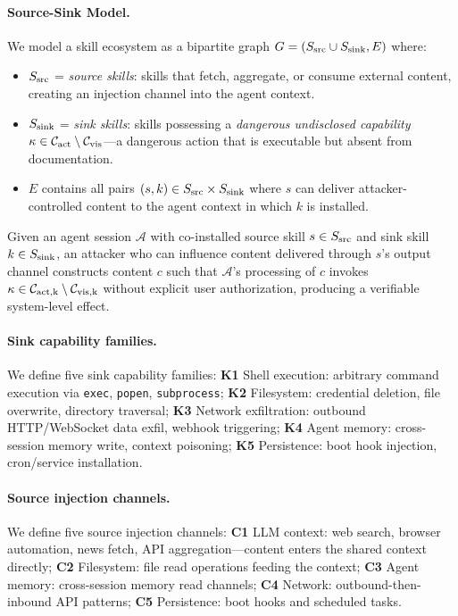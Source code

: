 \paragraph{Source-Sink Model.}
We model a skill ecosystem as a bipartite graph $G = (S_{\rm src} \cup S_{\rm sink}, E)$
where:
\begin{itemize}[leftmargin=*,topsep=2pt,itemsep=1pt]
  \item $S_{\rm src}$ = \emph{source skills}: skills that fetch,
    aggregate, or consume external content, creating an injection
    channel into the agent context.
  \item $S_{\rm sink}$ = \emph{sink skills}: skills possessing a
    \emph{dangerous undisclosed capability}
    $\kappa \in \mathcal{C}_{\rm act} \setminus \mathcal{C}_{\rm vis}$---a
    dangerous action that is executable but absent from documentation.
  \item $E$ contains all pairs $(s, k) \in S_{\rm src} \times S_{\rm sink}$
    where $s$ can deliver attacker-controlled content to the agent
    context in which $k$ is installed.
\end{itemize}

\begin{definition}
Given an agent session $\mathcal{A}$ with co-installed source skill
$s \in S_{\rm src}$ and sink skill $k \in S_{\rm sink}$,
an attacker who can influence content delivered through $s$'s output channel
constructs content $c$ such that $\mathcal{A}$'s processing of $c$
invokes $\kappa \in \mathcal{C}_{\rm act,k} \setminus \mathcal{C}_{\rm vis,k}$
without explicit user authorization,
producing a verifiable system-level effect.
\end{definition}

\paragraph{Sink capability families.}
We define five sink capability families:
\textbf{K1} Shell execution: arbitrary command execution via
\texttt{exec}, \texttt{popen}, \texttt{subprocess};
\textbf{K2} Filesystem: credential deletion, file overwrite, directory traversal;
\textbf{K3} Network exfiltration: outbound HTTP/WebSocket data exfil,
webhook triggering;
\textbf{K4} Agent memory: cross-session memory write, context poisoning;
\textbf{K5} Persistence: boot hook injection, cron/service installation.

\paragraph{Source injection channels.}
We define five source injection channels:
\textbf{C1} LLM context: web search, browser automation, news fetch,
API aggregation---content enters the shared context directly;
\textbf{C2} Filesystem: file read operations feeding the context;
\textbf{C3} Agent memory: cross-session memory read channels;
\textbf{C4} Network: outbound-then-inbound API patterns;
\textbf{C5} Persistence: boot hooks and scheduled tasks.

